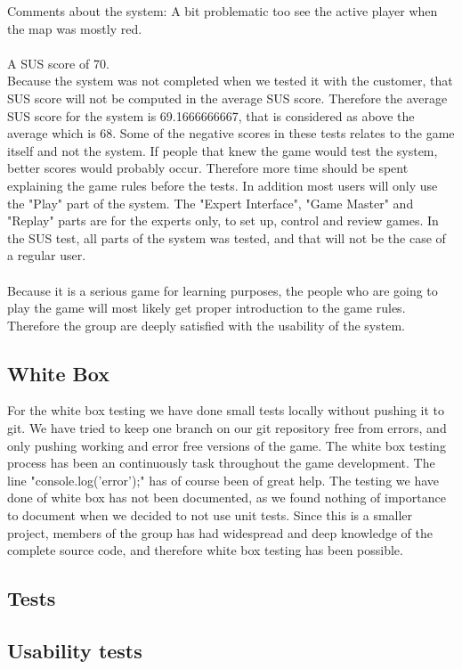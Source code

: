 Comments about the system: A bit problematic too see the active player when the map was mostly red.\\

\\A SUS score of 70.\\

Because the system was not completed when we tested it with the customer, that SUS score will not be computed in the average SUS score. Therefore the average SUS score for the system is 69.1666666667, that is considered as above the average which is 68. Some of the negative scores in these tests relates to the game itself and not the system. If people that knew the game would test the system, better scores would probably occur. Therefore more time should be spent explaining the game rules before the tests. In addition most users will only use the "Play" part of the system. The "Expert Interface", "Game Master" and "Replay" parts are for the experts only, to set up, control and review games. In the SUS test, all parts of the system was tested, and that will not be the case of a regular user.\\
\\
Because it is a serious game for learning purposes, the people who are going to play the game will most likely get proper introduction to the game rules. Therefore the group are deeply satisfied with the usability of the system. 
\subsection{White Box}
For the white box testing we have done small tests locally without pushing it to git. We have tried to keep one branch on our git repository free from errors, and only pushing working and error free versions of the game. The white box testing process has been an continuously task throughout the game development. The line "console.log('error');" has of course been of great help. The testing we have done of white box  has not been documented, as we found nothing of importance to document when we decided to not use unit tests. Since this is a smaller project, members of the group has had widespread and deep knowledge of the complete source code, and therefore white box testing has been possible.


\subsection{Tests}




\subsection{Usability tests}


